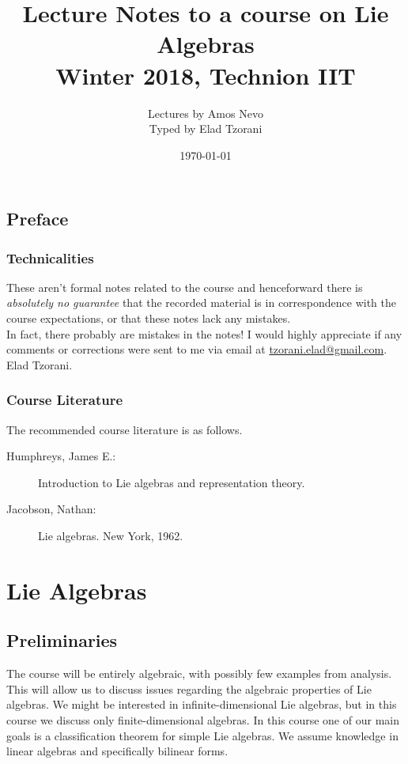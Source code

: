 \documentclass[10pt,a4paper,twoside,openany,hidelinks]{book}
\title{Lecture Notes to a course on Lie Algebras \\ \large{Winter 2018, Technion IIT}}
\author{Lectures by Amos Nevo \\ \large Typed by Elad Tzorani}
\date{\today}
\begin{document}
\frontmatter
{}
\tableofcontents
\countlectures
\newpage

\chapter*{Preface}
 

\section*{Technicalities}

These aren't formal notes related to the course and henceforward there is \emph{absolutely no guarantee} that the recorded material is in correspondence with the course expectations, or that these notes lack any mistakes.\\
In fact, there probably are mistakes in the notes! I would highly appreciate if any comments or corrections were sent to me via email at \href{mailto:tzorani.elad@gmail.com}{tzorani.elad@gmail.com}.\\
Elad Tzorani.

\section*{Course Literature}

The recommended course literature is as follows.

\begin{description}
\item[Humphreys, James E.:] Introduction to Lie algebras and representation theory.

\item[Jacobson, Nathan:] Lie algebras. New York, 1962.
\end{description}

\mainmatter

\part{Lie Algebras}
\chapter{Preliminaries}

The course will be entirely algebraic, with possibly few examples from analysis.%
This will allow us to discuss issues regarding the algebraic properties of Lie algebras.
We might be interested in infinite-dimensional Lie algebras, but in this course we discuss only finite-dimensional algebras.
In this course one of our main goals is a classification theorem for simple Lie algebras.
We assume knowledge in linear algebras and specifically bilinear forms.
\end{document}
